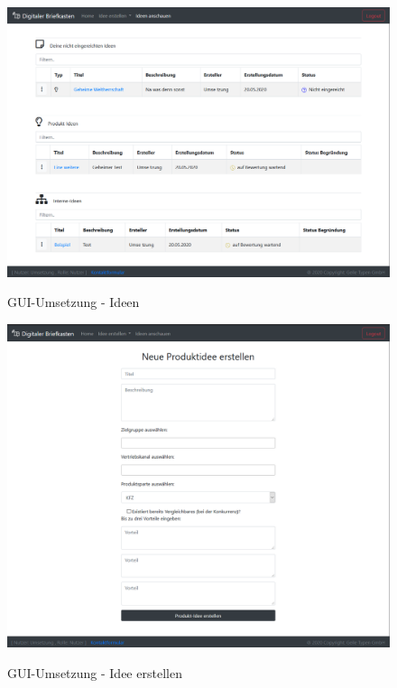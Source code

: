 \begin{figure}[h]
\centering
\begin{minipage}[t]{1\textwidth} 
\caption{GUI-Umsetzung - Ideen}
\includegraphics[width=1\textwidth]{img/ideen-umsetzung.png}\\
\end{minipage}
\end{figure}

\begin{figure}[h]
\centering
\begin{minipage}[t]{1\textwidth} 
\caption{GUI-Umsetzung - Idee erstellen } 
\includegraphics[width=1\textwidth]{img/createIdea-umsetzung.png}\\
\end{minipage}
\end{figure}

